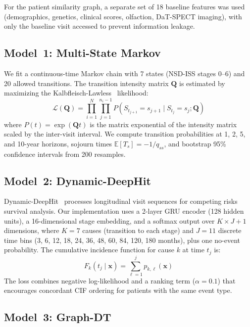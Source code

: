 For the patient similarity graph, a separate set of 18 baseline features was used (demographics, genetics, clinical scores, olfaction, DaT-SPECT imaging), with only the baseline visit accessed to prevent information leakage.

\subsection{Model~1: Multi-State Markov}
\label{p3:sec:markov}

We fit a continuous-time Markov chain with 7 states (NSD-ISS stages 0--6) and 20 allowed transitions. The transition intensity matrix $\mathbf{Q}$ is estimated by maximizing the Kalbfleisch-Lawless~\cite{kalbfleisch1985} likelihood:
\begin{equation}
    \mathcal{L}(\mathbf{Q}) = \prod_{i=1}^{N} \prod_{j=1}^{n_i - 1} P(S_{t_{j+1}} = s_{j+1} \mid S_{t_j} = s_j; \mathbf{Q})
\end{equation}
where $P(t) = \exp(\mathbf{Q} t)$ is the matrix exponential of the intensity matrix scaled by the inter-visit interval. We compute transition probabilities at 1, 2, 5, and 10-year horizons, sojourn times $\mathbb{E}[T_s] = -1/q_{ss}$, and bootstrap 95\% confidence intervals from 200 resamples.

\subsection{Model~2: Dynamic-DeepHit}
\label{p3:sec:deephit}

Dynamic-DeepHit~\cite{lee2019} processes longitudinal visit sequences for competing risks survival analysis. Our implementation uses a 2-layer GRU encoder (128 hidden units), a 16-dimensional stage embedding, and a softmax output over $K \times J + 1$ dimensions, where $K{=}7$ causes (transition to each stage) and $J{=}11$ discrete time bins (3, 6, 12, 18, 24, 36, 48, 60, 84, 120, 180 months), plus one no-event probability. The cumulative incidence function for cause $k$ at time $t_j$ is:
\begin{equation}
    F_k(t_j \mid \mathbf{x}) = \sum_{\ell=1}^{j} p_{k,\ell}(\mathbf{x})
\end{equation}
The loss combines negative log-likelihood and a ranking term ($\alpha{=}0.1$) that encourages concordant CIF ordering for patients with the same event type.

\subsection{Model~3: Graph-DT}
\label{p3:sec:graphdt}

